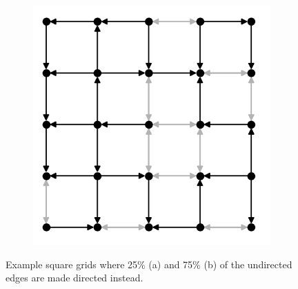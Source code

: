 \begin{figure}[t]
\begin{subfigure}{.40\textwidth}
    \includegraphics[width=1.0\linewidth]{figures/dir_lattice_075.png}
    \caption{}
    \label{fig:dir-lattice-b}
  \end{subfigure}
  \caption{
    Example square grids where 25\% (a) and 75\% (b) of the undirected edges are
made directed instead.
  }
  \label{fig:dir-lattice}
\end{figure}

